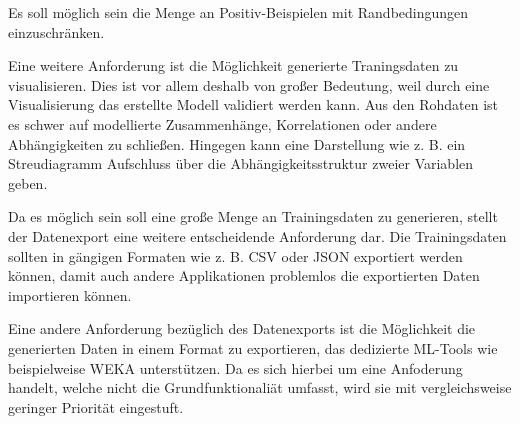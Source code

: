 Es soll möglich sein die Menge an Positiv-Beispielen mit Randbedingungen einzuschränken.

Eine weitere Anforderung ist die Möglichkeit generierte Traningsdaten zu visualisieren. Dies ist vor allem deshalb von großer Bedeutung, weil durch eine Visualisierung das erstellte Modell validiert werden kann. Aus den Rohdaten ist es schwer auf modellierte Zusammenhänge, Korrelationen oder andere Abhängigkeiten zu schließen. Hingegen kann eine Darstellung wie z. B. ein Streudiagramm Aufschluss über die Abhängigkeitsstruktur zweier Variablen geben.

Da es möglich sein soll eine große Menge an Trainingsdaten zu generieren, stellt der Datenexport eine weitere entscheidende Anforderung dar. Die Trainingsdaten sollten in gängigen Formaten wie z. B. CSV oder JSON exportiert werden können, damit auch andere Applikationen problemlos die exportierten Daten importieren können.

Eine andere Anforderung bezüglich des Datenexports ist die Möglichkeit die generierten Daten in einem Format zu exportieren, das dedizierte ML-Tools wie beispielweise WEKA unterstützen. Da es sich hierbei um eine Anfoderung handelt, welche nicht die Grundfunktionaliät umfasst, wird sie mit vergleichsweise geringer Priorität eingestuft. 

